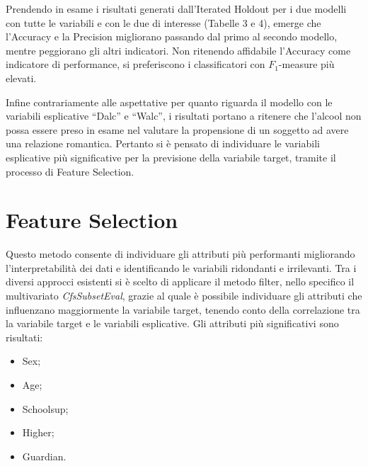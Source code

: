 \documentclass[12pt,a4paper]{report}
\begin{document}
\begin{multicols}{2}
Prendendo in esame i risultati generati dall’Iterated Holdout per i due modelli con tutte le variabili e con le due di interesse (Tabelle 3 e 4), emerge che l’Accuracy e la Precision migliorano passando dal primo al secondo modello, mentre peggiorano gli altri indicatori. Non ritenendo affidabile l’Accuracy come indicatore di performance, si preferiscono i classificatori con $F_1$-measure più elevati.

Infine contrariamente alle aspettative per quanto riguarda il modello con le variabili esplicative “Dalc” e “Walc”, i risultati portano a ritenere che l'alcool non possa essere preso in esame nel valutare la propensione di un soggetto ad avere una relazione romantica. Pertanto si è pensato di individuare le variabili esplicative più significative per la previsione della variabile target, tramite il processo di Feature Selection. 

	\section{Feature Selection}
	
	Questo metodo consente di individuare gli attributi più performanti migliorando l’interpretabilità dei dati e identificando le variabili ridondanti e irrilevanti. 
	Tra i diversi approcci esistenti si è scelto di applicare il metodo filter, nello specifico il multivariato \textit{CfsSubsetEval}, grazie al quale è possibile individuare gli attributi che influenzano maggiormente la variabile target, tenendo conto della correlazione tra la variabile target e le variabili esplicative.
	Gli attributi più significativi sono risultati:
	\begin{itemize}
		\item Sex;
		\item Age;
		\item Schoolsup;
			\item Higher;
			\item Guardian.	
	\end{itemize}


\end{multicols}
\end{document}

